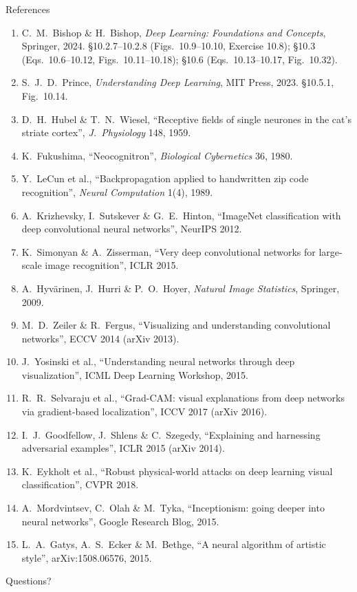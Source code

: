 \documentclass[aspectratio=169, 11pt]{beamer}
\newcommand{\nosrc}{}       %
\begin{document}
\begin{frame}[allowframebreaks]{References}
  \nosrc
  \vspace{0.3em}
  {\scriptsize
  \begin{enumerate}\itemsep0.30em
    \item C.\ M.\ Bishop \& H.\ Bishop, \emph{Deep Learning: Foundations
          and Concepts}, Springer, 2024. \S10.2.7--10.2.8
          (Figs.~10.9--10.10, Exercise 10.8); \S10.3 (Eqs.~10.6--10.12,
          Figs.~10.11--10.18); \S10.6 (Eqs.~10.13--10.17, Fig.~10.32).
    \item S.\ J.\ D.\ Prince, \emph{Understanding Deep Learning}, MIT
          Press, 2023. \S10.5.1, Fig.~10.14.
    \item D.\ H.\ Hubel \& T.\ N.\ Wiesel, ``Receptive fields of single
          neurones in the cat's striate cortex'', \emph{J.\ Physiology}
          148, 1959.
    \item K.\ Fukushima, ``Neocognitron'', \emph{Biological
          Cybernetics} 36, 1980.
    \item Y.\ LeCun et al., ``Backpropagation applied to handwritten
          zip code recognition'', \emph{Neural Computation} 1(4), 1989.
    \item A.\ Krizhevsky, I.\ Sutskever \& G.\ E.\ Hinton, ``ImageNet
          classification with deep convolutional neural networks'',
          NeurIPS 2012.
    \item K.\ Simonyan \& A.\ Zisserman, ``Very deep convolutional
          networks for large-scale image recognition'', ICLR 2015.
    \item A.\ Hyv\"arinen, J.\ Hurri \& P.\ O.\ Hoyer, \emph{Natural
          Image Statistics}, Springer, 2009.
    \item M.\ D.\ Zeiler \& R.\ Fergus, ``Visualizing and understanding
          convolutional networks'', ECCV 2014 (arXiv 2013).
    \item J.\ Yosinski et al., ``Understanding neural networks through
          deep visualization'', ICML Deep Learning Workshop, 2015.
    \item R.\ R.\ Selvaraju et al., ``Grad-CAM: visual explanations from
          deep networks via gradient-based localization'', ICCV 2017
          (arXiv 2016).
    \item I.\ J.\ Goodfellow, J.\ Shlens \& C.\ Szegedy, ``Explaining and
          harnessing adversarial examples'', ICLR 2015 (arXiv 2014).
    \item K.\ Eykholt et al., ``Robust physical-world attacks on deep
          learning visual classification'', CVPR 2018.
    \item A.\ Mordvintsev, C.\ Olah \& M.\ Tyka, ``Inceptionism: going
          deeper into neural networks'', Google Research Blog, 2015.
    \item L.\ A.\ Gatys, A.\ S.\ Ecker \& M.\ Bethge, ``A neural
          algorithm of artistic style'', arXiv:1508.06576, 2015.
  \end{enumerate}}
\end{frame}

\begin{frame}[standout]
  \nosrc
  Questions?
\end{frame}
\end{document}
